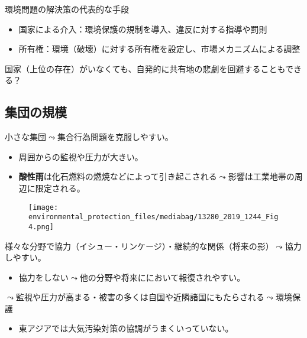 \documentclass[
  xelatex,
  ja=standard]{bxjsarticle}
\providecommand{\tightlist}{%
  \setlength{\itemsep}{0pt}\setlength{\parskip}{0pt}}\usepackage{longtable,booktabs,array}
\begin{document}
環境問題の解決策の代表的な手段

\begin{itemize}
\tightlist
\item
  国家による介入：環境保護の規制を導入、違反に対する指導や罰則
\item
  所有権：環境（破壊）に対する所有権を設定し、市場メカニズムによる調整
\end{itemize}

国家（上位の存在）がいなくても、自発的に共有地の悲劇を回避することもできる？\citep{ostrom2022}

\hypertarget{ux96c6ux56e3ux306eux898fux6a21}{%
\subsection{集団の規模}\label{ux96c6ux56e3ux306eux898fux6a21}}

小さな集団\(\leadsto\)集合行為問題を克服しやすい。

\begin{itemize}
\tightlist
\item
  周囲からの監視や圧力が大きい。
\item
  \textbf{酸性雨}は化石燃料の燃焼などによって引き起こされる\(\leadsto\)影響は工業地帯の周辺に限定される。
\end{itemize}

\begin{figure}[htpb]

{\centering \texttt{[image: environmental\_protection\_files/mediabag/13280\_2019\_1244\_Fig4.png]}

}

\caption{\citet{grennfelt2020}}

\end{figure}

様々な分野で協力（イシュー・リンケージ）・継続的な関係（将来の影）\(\leadsto\)協力しやすい。

\begin{itemize}
\tightlist
\item
  協力をしない\(\leadsto\)他の分野や将来ににおいて報復されやすい。
\end{itemize}

\(\leadsto\)監視や圧力が高まる・被害の多くは自国や近隣諸国にもたらされる\(\leadsto\)環境保護

\begin{itemize}
\tightlist
\item
  東アジアでは大気汚染対策の協調がうまくいっていない。
\end{itemize}
\end{document}
